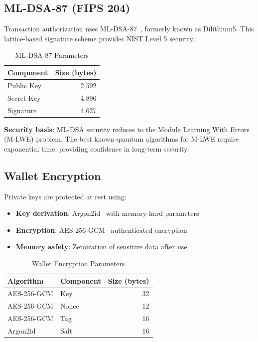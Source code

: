 \documentclass[11pt,a4paper]{article}
\begin{document}
\subsection{ML-DSA-87 (FIPS 204)}

Transaction authorization uses ML-DSA-87~\cite{fips204}, formerly known as Dilithium5. This lattice-based signature scheme provides NIST Level 5 security.

\begin{table}[h]
\centering
\caption{ML-DSA-87 Parameters}
\label{tab:mldsa}
\begin{tabular}{@{}lr@{}}
\toprule
Component & Size (bytes) \\
\midrule
Public Key & 2,592 \\
Secret Key & 4,896 \\
Signature & 4,627 \\
\bottomrule
\end{tabular}
\end{table}

\textbf{Security basis}: ML-DSA security reduces to the Module Learning With Errors (M-LWE) problem. The best known quantum algorithms for M-LWE require exponential time, providing confidence in long-term security.

\subsection{Wallet Encryption}

Private keys are protected at rest using:

\begin{itemize}
    \item \textbf{Key derivation}: Argon2id~\cite{rfc9106} with memory-hard parameters
    \item \textbf{Encryption}: AES-256-GCM~\cite{nist-gcm} authenticated encryption
    \item \textbf{Memory safety}: Zeroization of sensitive data after use
\end{itemize}

\begin{table}[h]
\centering
\caption{Wallet Encryption Parameters}
\begin{tabular}{@{}llr@{}}
\toprule
Algorithm & Component & Size (bytes) \\
\midrule
AES-256-GCM & Key & 32 \\
AES-256-GCM & Nonce & 12 \\
AES-256-GCM & Tag & 16 \\
Argon2id & Salt & 16 \\
\bottomrule
\end{tabular}
\end{table}
\end{document}
